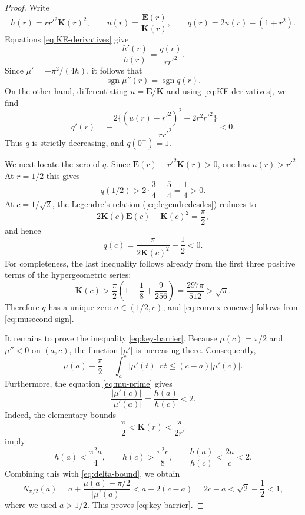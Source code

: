 \documentclass[10pt,a4paper]{amsart}
\newcommand{\Ec}{\mathbf E}
\newcommand{\Kc}{\mathbf K}
\newcommand{\dd}{\,\mathrm d}
\begin{document}
\begin{proof}
Write
\[
 h(r)=rr'^2\Kc(r)^2,
 \qquad
 u(r)=\frac{\Ec(r)}{\Kc(r)},
 \qquad
 q(r)=2u(r)-(1+r^2).
\]
Equations \eqref{eq:KE-derivatives} give
\begin{equation}\label{eq:h-log}
 \frac{h'(r)}{h(r)}=\frac{q(r)}{rr'^2}.
\end{equation}
Since $\mu'=-\pi^2/(4h)$, it follows that
\begin{equation}\label{eq:musecond-sign}
 \operatorname{sgn}\mu''(r)=\operatorname{sgn}q(r).
\end{equation}
On the other hand, differentiating $u=\Ec/\Kc$ and using
\eqref{eq:KE-derivatives}, we find
\begin{equation}\label{eq:qprime}
 q'(r)=-\frac{2\{(u(r)-r'^2)^2+2r^2r'^2\}}{rr'^2}<0.
\end{equation}
Thus $q$ is strictly decreasing, and $q(0^+)=1$.

We next locate the zero of $q.$  Since $\Ec(r)-r'^2\Kc(r)>0$, one has $u(r)>r'^2$.  At $r=1/2$ this
gives
\[
 q(1/2)>2\cdot\frac34-\frac54=\frac14>0.
\]
At $c=1/\sqrt2$, the Legendre's relation (\ref{eq:legendredcsdcs}) reduces to
\[
 2\Kc(c)\Ec(c)-\Kc(c)^2=\frac\pi2,
\]
and hence
\[
 q(c)=\frac{\pi}{2\Kc(c)^2}-\frac12<0.
\]
For completeness, the last inequality follows already from the first three
positive terms of the hypergeometric series:
\[
 \Kc(c)>
 \frac\pi2\left(1+\frac18+\frac9{256}\right)
 =\frac{297\pi}{512}>\sqrt\pi.
\]
Therefore $q$ has a unique zero $a\in(1/2,c)$, and
\eqref{eq:convex-concave} follows from \eqref{eq:musecond-sign}.

It remains to prove the inequality \eqref{eq:key-barrier}.  Because
$\mu(c)=\pi/2$ and $\mu''<0$ on $(a,c)$, the function
$|\mu'|$ is increasing there.  Consequently,
\begin{equation}\label{eq:delta-bound}
 \mu(a)-\frac\pi2
 =\int_a^c|\mu'(t)|\dd t
 \le(c-a)|\mu'(c)|.
\end{equation}
Furthermore, the equation \eqref{eq:mu-prime} gives
\[
 \frac{|\mu'(c)|}{|\mu'(a)|}=\frac{h(a)}{h(c)}<2.
\]
Indeed, the elementary bounds
\[
 \frac\pi2<\Kc(r)<\frac\pi{2r'}
\]
imply
\[
 h(a)<\frac{\pi^2a}{4},
 \qquad
 h(c)>\frac{\pi^2c}{8},
 \qquad
 \frac{h(a)}{h(c)}<\frac{2a}{c}<2.
\]
Combining this with \eqref{eq:delta-bound}, we obtain
\[
 N_{\pi/2}(a)
 =a+\frac{\mu(a)-\pi/2}{|\mu'(a)|}
 <a+2(c-a)=2c-a
 <\sqrt2-\frac12<1,
\]
where we used $a>1/2$.  This proves \eqref{eq:key-barrier}.
\end{proof}
\end{document}
